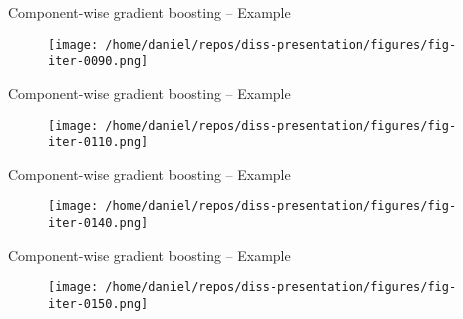 \begin{frame}{Component-wise gradient boosting -- Example}
	\begin{figure}
		\centering
		\texttt{[image: /home/daniel/repos/diss-presentation/figures/fig-iter-0090.png]}
	\end{figure}
	\addtocounter{framenumber}{-1}
\end{frame}


\begin{frame}{Component-wise gradient boosting -- Example}
	\begin{figure}
		\centering
		\texttt{[image: /home/daniel/repos/diss-presentation/figures/fig-iter-0110.png]}
	\end{figure}
	\addtocounter{framenumber}{-1}
\end{frame}


\begin{frame}{Component-wise gradient boosting -- Example}
	\begin{figure}
		\centering
		\texttt{[image: /home/daniel/repos/diss-presentation/figures/fig-iter-0140.png]}
	\end{figure}
	\addtocounter{framenumber}{-1}
\end{frame}


\begin{frame}{Component-wise gradient boosting -- Example}
	\begin{figure}
		\centering
		\texttt{[image: /home/daniel/repos/diss-presentation/figures/fig-iter-0150.png]}
	\end{figure}
	\addtocounter{framenumber}{-1}
\end{frame}

